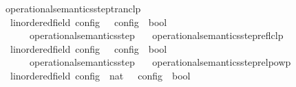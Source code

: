 \begin{isabellebody}
\isanewline
{}\isamarkupfalse%
\ operational{\isacharunderscore}semantics{\isacharunderscore}step{\isacharunderscore}tranclp\isanewline
\ \ {\isacharcolon}{\isacharcolon}{\isacartoucheopen}{\isacharparenleft}{\isacharprime}{\isasymtau}{\isacharcolon}{\isacharcolon}linordered{\isacharunderscore}field{\isacharparenright}\ config\ {\isasymRightarrow}\ {\isacharprime}{\isasymtau}\ config\ {\isasymRightarrow}\ bool{\isacartoucheclose}\ \ \ \ \ \ \ \ \ \ \ \ \ \ {\isacharparenleft}{\isacartoucheopen}{\isacharunderscore}\ {\isasymhookrightarrow}\isactrlsup {\isacharplus}\isactrlsup {\isacharplus}\ {\isacharunderscore}{\isacartoucheclose}\ {}{}{\isacharparenright}\isanewline
{}\isanewline
\ \ {\isacartoucheopen}{\isasymC}\ {\isasymhookrightarrow}\isactrlsup {\isacharplus}\isactrlsup {\isacharplus}\ {\isasymC}\ {\isasymequiv}\ operational{\isacharunderscore}semantics{\isacharunderscore}step\isactrlsup {\isacharplus}\isactrlsup {\isacharplus}\ {\isasymC}\ {\isasymC}\isanewline
\isanewline
{}\isamarkupfalse%
\ operational{\isacharunderscore}semantics{\isacharunderscore}step{\isacharunderscore}reflclp\isanewline
\ \ {\isacharcolon}{\isacharcolon}{\isacartoucheopen}{\isacharparenleft}{\isacharprime}{\isasymtau}{\isacharcolon}{\isacharcolon}linordered{\isacharunderscore}field{\isacharparenright}\ config\ {\isasymRightarrow}\ {\isacharprime}{\isasymtau}\ config\ {\isasymRightarrow}\ bool{\isacartoucheclose}\ \ \ \ \ \ \ \ \ \ \ \ \ \ {\isacharparenleft}{\isacartoucheopen}{\isacharunderscore}\ {\isasymhookrightarrow}\isactrlsup {\isacharequal}\isactrlsup {\isacharequal}\ {\isacharunderscore}{\isacartoucheclose}\ {}{}{\isacharparenright}\isanewline
{}\isanewline
\ \ {\isacartoucheopen}{\isasymC}\ {\isasymhookrightarrow}\isactrlsup {\isacharequal}\isactrlsup {\isacharequal}\ {\isasymC}\ {\isasymequiv}\ operational{\isacharunderscore}semantics{\isacharunderscore}step\isactrlsup {\isacharequal}\isactrlsup {\isacharequal}\ {\isasymC}\ {\isasymC}\isanewline
\isanewline
{}\isamarkupfalse%
\ operational{\isacharunderscore}semantics{\isacharunderscore}step{\isacharunderscore}relpowp\isanewline
\ \ {\isacharcolon}{\isacharcolon}{\isacartoucheopen}{\isacharparenleft}{\isacharprime}{\isasymtau}{\isacharcolon}{\isacharcolon}linordered{\isacharunderscore}field{\isacharparenright}\ config\ {\isasymRightarrow}\ nat\ {\isasymRightarrow}\ {\isacharprime}{\isasymtau}\ config\ {\isasymRightarrow}\ bool{\isacartoucheclose}\ \ \ \ \ \ \ {\isacharparenleft}{\isacartoucheopen}{\isacharunderscore}\ {\isasymhookrightarrow}\isactrlbsup {\isacharunderscore}\isactrlesup \ {\isacharunderscore}{\isacartoucheclose}\ {}{}{\isacharparenright}\isanewline

\end{isabellebody}
